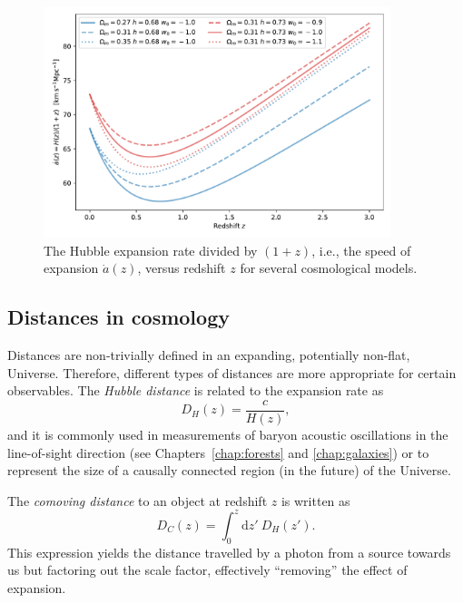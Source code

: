     \begin{figure}
        \centering 
        \includegraphics[width=0.9\textwidth]{fig/intro/hubble.pdf}
        \caption{The Hubble expansion rate divided by $(1+z)$, i.e., the speed of expansion $\dot{a}(z)$, 
        versus redshift $z$ for several cosmological models. }
        \label{fig:hubble_theory}
    \end{figure}

    \subsection{Distances in cosmology}
    \label{intro:model:distances}

    Distances are non-trivially defined in an expanding, potentially non-flat, Universe. 
    Therefore, different types of distances are more appropriate for certain observables.
    The \emph{Hubble distance} is related to the expansion rate as 
    \begin{equation}
        D_H(z) = \frac{c}{H(z)},
        \label{eq:hubble_distance}
    \end{equation}
    and it is commonly used in measurements of baryon acoustic oscillations in the line-of-sight 
    direction (see Chapters~\ref{chap:forests} and \ref{chap:galaxies}) or to represent the
    size of a causally connected region (in the future) of the Universe. 
    
    The \emph{comoving distance} to 
    an object at redshift $z$ is written as
    \begin{equation}
        D_C(z)  = \int_0^z \mathrm{d}z' ~ D_H(z').
        \label{eq:comoving_distance}
    \end{equation} 
    This expression yields the distance travelled by a photon from a source towards us but 
    factoring out the scale factor, effectively ``removing'' the effect of expansion. 
    
